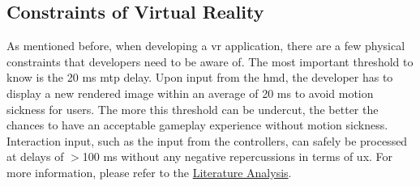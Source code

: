 \subsection{Constraints of Virtual Reality}
\label{ssec:vrphy}
As mentioned before, when developing a \acrshort{vr} application, there are a few physical constraints that developers need to be aware of. The most important threshold to know is the 20 \acrshort{ms} \acrfull{mtp} delay. Upon input from the \acrfull{hmd}, the developer has to display a new rendered image within an average of 20 \acrshort{ms} to avoid motion sickness for users. The more this threshold can be undercut, the better the chances to have an acceptable gameplay experience without motion sickness. Interaction input, such as the input from the controllers, can safely be processed at delays of $>$100 \acrshort{ms} without any negative repercussions in terms of \acrfull{ux}. For more information, please refer to the \hyperref[sec:lit]{Literature Analysis}.
